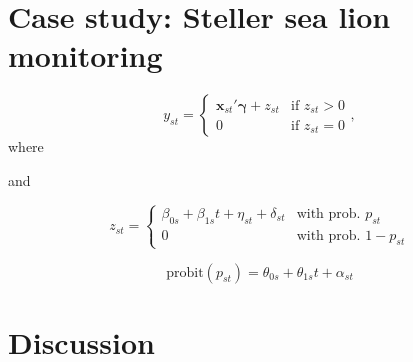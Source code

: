 \documentclass[12pt,letter]{article}
\newcommand{\bx}{\ensuremath{\mathbf{x}}}
\newcommand{\bg}{\ensuremath{\boldsymbol{\gamma}}}
\begin{document}
\section{Case study: Steller sea lion monitoring}

\begin{equation}
y_{st} = \left\{
	\begin{array}{ll} 
	\bx_{st}'\bg + z_{st} & \mbox{if } z_{st}>0\\
	0 & \mbox{if } z_{st}=0
	\end{array}\right.,
\end{equation}
where 

\centerline{and}
\begin{equation}
z_{st} = \left\{
	\begin{array}{ll}
		\beta_{0s} + \beta_{1s}t + \eta_{st} + \delta_{st} & \mbox{with prob. } p_{st}\\
		0 & \mbox{with prob. } 1-p_{st}
	\end{array}\right.
\end{equation}

\begin{equation}
\mbox{probit}(p_{st}) = \theta_{0s} + \theta_{1s}t + \alpha_{st}
\end{equation}


\section{Discussion}
\end{document}
